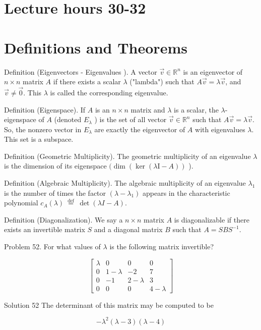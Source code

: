 \documentclass[10pt]{article}
\begin{document}
\section*{Lecture hours 30-32}
\section*{Definitions and Theorems}
Definition (Eigenvectors - Eigenvalues ). A vector $\vec{v} \in \mathbb{R}^{n}$ is an eigenvector of $n \times n$ matrix $A$ if there exists a scalar $\lambda$ ("lambda") such that $A \vec{v}=\lambda \vec{v}$, and $\vec{v} \neq \overrightarrow{0}$. This $\lambda$ is called the corresponding eigenvalue.

Definition (Eigenspace). If $A$ is an $n \times n$ matrix and $\lambda$ is a scalar, the $\lambda$-eigenspace of $A$ (denoted $E_{\lambda}$ ) is the set of all vector $\vec{v} \in \mathbb{R}^{n}$ such that $A \vec{v}=\lambda \vec{v}$. So, the nonzero vector in $E_{\lambda}$ are exactly the eigenvector of $A$ with eigenvalues $\lambda$. This set is a subspace.

Definition (Geometric Multiplicity). The geometric multiplicity of an eigenvalue $\lambda$ is the dimension of its eigenspace $(\operatorname{dim}(\operatorname{ker}(\lambda \mathrm{I}-A))$ ).

Definition (Algebraic Multiplicity). The algebraic multiplicity of an eigenvalue $\lambda_{1}$ is the number of times the factor $\left(\lambda-\lambda_{1}\right)$ appears in the characteristic polynomial $c_{A}(\lambda) \stackrel{\text { def }}{=} \operatorname{det}(\lambda I-A)$.

Definition (Diagonalization). We say a $n \times n$ matrix $A$ is diagonalizable if there exists an invertible matrix $S$ and a diagonal matrix $B$ such that $A=S B S^{-1}$.

Problem 52. For what values of $\lambda$ is the following matrix invertible?

$$
\left[\begin{array}{cccc}
\lambda & 0 & 0 & 0 \\
0 & 1-\lambda & -2 & 7 \\
0 & -1 & 2-\lambda & 3 \\
0 & 0 & 0 & 4-\lambda
\end{array}\right]
$$

Solution 52 The determinant of this matrix may be computed to be

$$
-\lambda^{2}(\lambda-3)(\lambda-4)
$$
\end{document}
